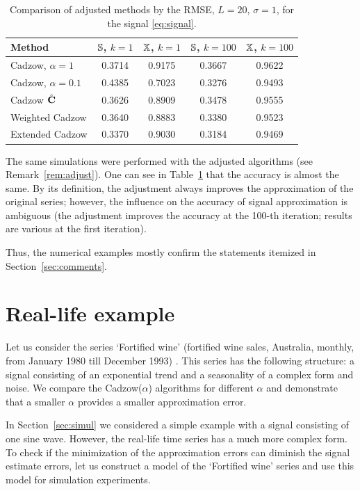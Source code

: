 \documentclass[sii]{ipart}
\begin{document}
\begin{table}
	\begin{center}
		\caption{Comparison of adjusted methods by the RMSE, $L = 20$, $\sigma=1$, for the signal \eqref{eq:signal}.}\label{fintable_improved}
		\begin{tabular*}{\textwidth}{@{\extracolsep{\fill}}lcccc}
			\hline
			Method & $\mathbb{S}$, $k = 1$ & $\mathbb{X}$, $k = 1$ & $\mathbb{S}$, $k = 100$ & $\mathbb{X}$, $k = 100$  \\
			\hline
			Cadzow, $\alpha = 1$ & 0.3714 & 0.9175 & 0.3667 & 0.9622 \\
			\hline
			Cadzow, $\alpha = 0.1$ & 0.4385 & 0.7023 & 0.3276 & 0.9493 \\
			\hline
			Cadzow $\hat{\mathbf{C}}$ & 0.3626 & 0.8909 & 0.3478 & 0.9555 \\
			\hline
			Weighted Cadzow & 0.3640 & 0.8883 & 0.3380 & 0.9523 \\
			\hline
			Extended Cadzow & 0.3370 & 0.9030 & 0.3184 & 0.9469 \\
			\hline
		\end{tabular*}
	\end{center}
\end{table}


The same simulations were performed with the adjusted algorithms (see Remark~\ref{rem:adjust}). One can see in Table~\ref{fintable_improved} that the accuracy is almost the same. By its definition, the adjustment always improves the approximation of the original series; however, the influence on the accuracy of signal approximation is ambiguous (the adjustment improves the accuracy at the 100-th iteration; results are various at the first iteration).


Thus, the numerical examples mostly confirm the statements itemized in Section~\ref{sec:comments}.

\section{Real-life example}
\label{sec:ex_real}
Let us consider the series `Fortified wine' (fortified wine sales, Australia, monthly, from January 1980 till December 1993) \citep{HyndmanTSDL}. This series has the following structure: a signal consisting of an exponential trend and a seasonality of a complex form and noise.
We compare the Cadzow($\alpha$) algorithms for different $\alpha$ and demonstrate that a smaller $\alpha$ provides
a smaller approximation error.

In Section~\ref{sec:simul} we considered a simple example with a signal consisting of one sine wave.
However, the real-life time series has a much more complex form. To check if the minimization of
the approximation errors can diminish the signal estimate errors,
let us construct a model of the `Fortified wine' series and use this model for simulation experiments.
\end{document}
